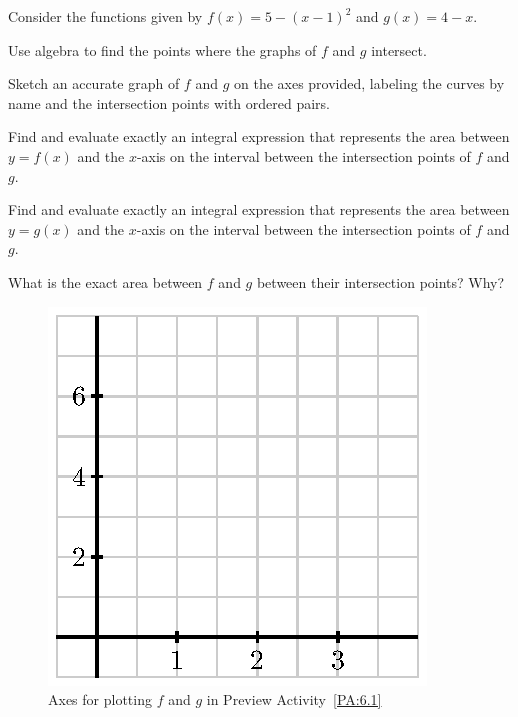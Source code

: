 \begin{pa} \label{PA:6.1}  Consider the functions given by $f(x) = 5-(x-1)^2$ and $g(x) = 4-x$.

\ba
	\item Use algebra to find the points where the graphs of $f$ and $g$ intersect.
	\item Sketch an accurate graph of $f$ and $g$ on the axes provided, labeling the curves by name and the intersection points with ordered pairs.
	\item Find and evaluate exactly an integral expression that represents the area between $y = f(x)$ and the $x$-axis on the interval between the intersection points of $f$ and $g$.
	\item Find and evaluate exactly an integral expression that represents the area between $y = g(x)$ and the $x$-axis on the interval between the intersection points of $f$ and $g$. 
	\item What is the exact area between $f$ and $g$ between their intersection points?  Why?
\ea

\begin{figure}[h]
\begin{center}
\includegraphics{figures/6_1_PA1.eps}
\caption{Axes for plotting $f$ and $g$ in Preview Activity~\ref{PA:6.1}} \label{F:6.1.Intro}
\end{center}
\end{figure}

\end{pa} 
\afterpa